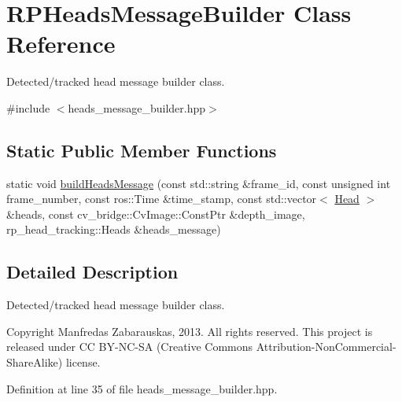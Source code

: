 \hypertarget{class_r_p_heads_message_builder}{\section{\-R\-P\-Heads\-Message\-Builder \-Class \-Reference}
\label{class_r_p_heads_message_builder}
}


\-Detected/tracked head message builder class.  




{\ttfamily \#include $<$heads\-\_\-message\-\_\-builder.\-hpp$>$}

\subsection*{\-Static \-Public \-Member \-Functions}
\begin{DoxyCompactItemize}
\item 
static void \hyperlink{class_r_p_heads_message_builder_a71fb699411567867dd4332b7fee22da4}{build\-Heads\-Message} (const std\-::string \&frame\-\_\-id, const unsigned int frame\-\_\-number, const ros\-::\-Time \&time\-\_\-stamp, const std\-::vector$<$ \hyperlink{struct_head}{\-Head} $>$ \&heads, const cv\-\_\-bridge\-::\-Cv\-Image\-::\-Const\-Ptr \&depth\-\_\-image, rp\-\_\-head\-\_\-tracking\-::\-Heads \&heads\-\_\-message)
\end{DoxyCompactItemize}


\subsection{\-Detailed \-Description}
\-Detected/tracked head message builder class. 

\begin{DoxyCopyright}{\-Copyright}
\-Manfredas \-Zabarauskas, 2013. \-All rights reserved. \-This project is released under \-C\-C \-B\-Y-\/\-N\-C-\/\-S\-A (\-Creative \-Commons \-Attribution-\/\-Non\-Commercial-\/\-Share\-Alike) license. 
\end{DoxyCopyright}


\-Definition at line 35 of file heads\-\_\-message\-\_\-builder.\-hpp.



